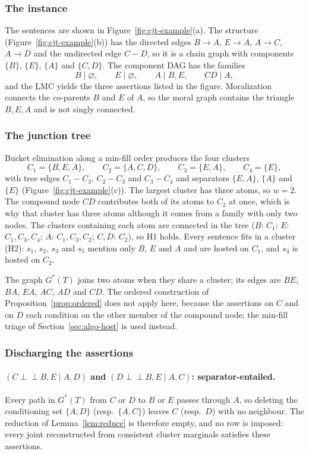 \documentclass{article} %
\newcommand{\indep}{\perp\!\!\!\perp}
\begin{document}
\subsubsection{The instance}

The sentences are shown in Figure~\ref{fig:cjt-example}(a). The structure
(Figure~\ref{fig:cjt-example}(b)) has the directed edges $B\to A$, $E\to A$,
$A\to C$, $A\to D$ and the undirected edge $C-D$, so it is a chain graph with
components $\{B\}$, $\{E\}$, $\{A\}$ and $\{C,D\}$. The component DAG has the
families
\[
  B\mid\varnothing,\qquad E\mid\varnothing,\qquad A\mid B,E,\qquad CD\mid A,
\]
and the LMC yields the three assertions listed in the figure. Moralization
connects the co-parents $B$ and $E$ of $A$, so the moral graph contains the
triangle $B,E,A$ and is not singly connected.

\subsubsection{The junction tree}

Bucket elimination along a min-fill order produces the four clusters
\[
  C_1=\{B,E,A\},\qquad C_2=\{A,C,D\},\qquad C_3=\{E,A\},\qquad C_4=\{E\},
\]
with tree edges $C_1-C_3$, $C_2-C_3$ and $C_3-C_4$ and separators
$\{E,A\}$, $\{A\}$ and $\{E\}$ (Figure~\ref{fig:cjt-example}(c)). The largest
cluster has three atoms, so $w=2$. The compound node $CD$ contributes both of its
atoms to $C_2$ at once, which is why that cluster has three atoms although it
comes from a family with only two nodes. The clusters containing each atom are
connected in the tree ($B$: $C_1$; $E$: $C_1,C_3,C_4$; $A$: $C_1,C_3,C_2$; $C,D$:
$C_2$), so H1 holds. Every sentence fits in a cluster (H2): $s_1$,
$s_2$, $s_3$ and $s_5$ mention only $B$, $E$ and $A$ and are hosted on $C_1$, and
$s_4$ is hosted on $C_2$.

The graph $G^\ast(T)$ joins two atoms when they share a cluster; its edges
are $BE$, $BA$, $EA$, $AC$, $AD$ and $CD$. The ordered construction of
Proposition~\ref{prop:ordered} does not apply here, because the assertions on $C$
and on $D$ each condition on the other member of the compound node; the
min-fill triage of Section~\ref{sec:algo-host} is used instead.

\subsubsection{Discharging the assertions}

\paragraph{$(C\indep B,E\mid A,D)$ and $(D\indep B,E\mid A,C)$: separator-entailed.}
Every path in $G^\ast(T)$ from $C$ or $D$ to $B$ or $E$ passes through $A$, so
deleting the conditioning set $\{A,D\}$ (resp.\ $\{A,C\}$) leaves $C$ (resp.\ $D$)
with no neighbour. The reduction of
Lemma~\ref{lem:reduce} is therefore empty, and no row is imposed: every joint
reconstructed from consistent cluster marginals satisfies these assertions.
\end{document}
